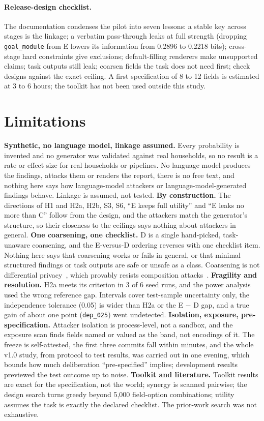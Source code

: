 \documentclass[11pt]{article}
\newcommand{\code}[1]{\texttt{#1}}
\begin{document}
\paragraph{Release-design checklist.} The documentation condenses the pilot into seven lessons: a stable key across stages is the linkage; a verbatim pass-through leaks at full strength (dropping \code{goal\_module} from E lowers its information from 0.2896 to 0.2218 bits); cross-stage hard constraints give exclusions; default-filling renderers make unsupported claims; task outputs still leak; coarsen fields the task does not need first; check designs against the exact ceiling. A first specification of 8 to 12 fields is estimated at 3 to 6 hours; the toolkit has not been used outside this study.

\section{Limitations}

\textbf{Synthetic, no language model, linkage assumed.} Every probability is invented and no generator was validated against real households, so no result is a rate or effect size for real households or pipelines. No language model produces the findings, attacks them or renders the report, there is no free text, and nothing here says how language-model attackers or language-model-generated findings behave. Linkage is assumed, not tested.
\textbf{By construction.} The directions of H1 and H2a, H2b, S3, S6, ``E keeps full utility'' and ``E leaks no more than C'' follow from the design, and the attackers match the generator's structure, so their closeness to the ceilings says nothing about attackers in general.
\textbf{One coarsening, one checklist.} D is a single hand-picked, task-unaware coarsening, and the E-versus-D ordering reverses with one checklist item. Nothing here says that coarsening works or fails in general, or that minimal structured findings or task outputs are safe or unsafe as a class. Coarsening is not differential privacy~\cite{dwork2006calibrating}, which provably resists composition attacks~\cite{ganta2008composition}.
\textbf{Fragility and resolution.} H2a meets its criterion in 3 of 6 seed runs, and the power analysis used the wrong reference gap. Intervals cover test-sample uncertainty only, the independence tolerance (0.05) is wider than H2a or the E $-$ D gap, and a true gain of about one point (\code{dep\_025}) went undetected.
\textbf{Isolation, exposure, pre-specification.} Attacker isolation is process-level, not a sandbox, and the exposure scan finds fields named or valued as the band, not encodings of it. The freeze is self-attested, the first three commits fall within minutes, and the whole v1.0 study, from protocol to test results, was carried out in one evening, which bounds how much deliberation ``pre-specified'' implies; development results previewed the test outcome up to noise.
\textbf{Toolkit and literature.} Toolkit results are exact for the specification, not the world; synergy is scanned pairwise; the design search turns greedy beyond 5,000 field-option combinations; utility assumes the task is exactly the declared checklist. The prior-work search was not exhaustive.
\end{document}
